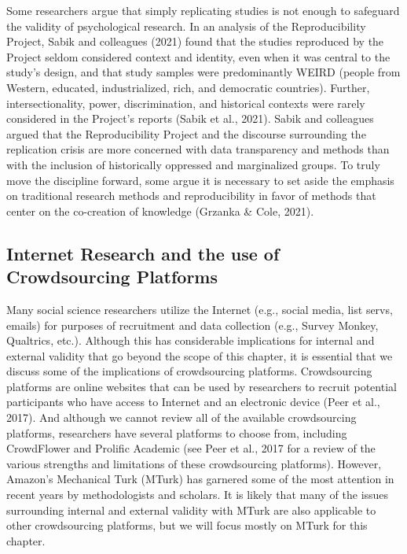 \documentclass[
  11pt,
]{book}
\begin{document}
Some researchers argue that simply replicating studies is not enough to safeguard the validity of psychological research. In an analysis of the Reproducibility Project, Sabik and colleagues (2021) found that the studies reproduced by the Project seldom considered context and identity, even when it was central to the study's design, and that study samples were predominantly WEIRD (people from Western, educated, industrialized, rich, and democratic countries). Further, intersectionality, power, discrimination, and historical contexts were rarely considered in the Project's reports (Sabik et al., 2021). Sabik and colleagues argued that the Reproducibility Project and the discourse surrounding the replication crisis are more concerned with data transparency and methods than with the inclusion of historically oppressed and marginalized groups. To truly move the discipline forward, some argue it is necessary to set aside the emphasis on traditional research methods and reproducibility in favor of methods that center on the co-creation of knowledge (Grzanka \& Cole, 2021).

\hypertarget{internet-research-and-the-use-of-crowdsourcing-platforms}{%
\subsection{Internet Research and the use of Crowdsourcing Platforms}\label{internet-research-and-the-use-of-crowdsourcing-platforms}}

Many social science researchers utilize the Internet (e.g., social media, list servs, emails) for purposes of recruitment and data collection (e.g., Survey Monkey, Qualtrics, etc.). Although this has considerable implications for internal and external validity that go beyond the scope of this chapter, it is essential that we discuss some of the implications of crowdsourcing platforms. Crowdsourcing platforms are online websites that can be used by researchers to recruit potential participants who have access to Internet and an electronic device (Peer et al., 2017). And although we cannot review all of the available crowdsourcing platforms, researchers have several platforms to choose from, including CrowdFlower and Prolific Academic (see Peer et al., 2017 for a review of the various strengths and limitations of these crowdsourcing platforms). However, Amazon's Mechanical Turk (MTurk) has garnered some of the most attention in recent years by methodologists and scholars. It is likely that many of the issues surrounding internal and external validity with MTurk are also applicable to other crowdsourcing platforms, but we will focus mostly on MTurk for this chapter.
\end{document}
